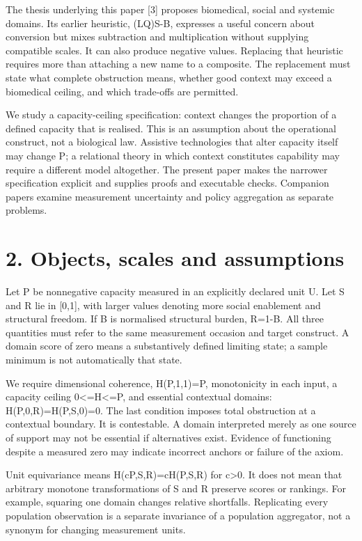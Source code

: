 \documentclass[11pt,a4paper]{article}
\begin{document}
The thesis underlying this paper [3] proposes biomedical, social and systemic domains. Its earlier heuristic, (LQ)S-B, expresses a useful concern about conversion but mixes subtraction and multiplication without supplying compatible scales. It can also produce negative values. Replacing that heuristic requires more than attaching a new name to a composite. The replacement must state what complete obstruction means, whether good context may exceed a biomedical ceiling, and which trade-offs are permitted.

We study a capacity-ceiling specification: context changes the proportion of a defined capacity that is realised. This is an assumption about the operational construct, not a biological law. Assistive technologies that alter capacity itself may change P; a relational theory in which context constitutes capability may require a different model altogether. The present paper makes the narrower specification explicit and supplies proofs and executable checks. Companion papers examine measurement uncertainty and policy aggregation as separate problems.

\section*{2. Objects, scales and assumptions}
Let P be nonnegative capacity measured in an explicitly declared unit U. Let S and R lie in [0,1], with larger values denoting more social enablement and structural freedom. If B is normalised structural burden, R=1-B. All three quantities must refer to the same measurement occasion and target construct. A domain score of zero means a substantively defined limiting state; a sample minimum is not automatically that state.

We require dimensional coherence, H(P,1,1)=P, monotonicity in each input, a capacity ceiling 0\textless{}=H\textless{}=P, and essential contextual domains: H(P,0,R)=H(P,S,0)=0. The last condition imposes total obstruction at a contextual boundary. It is contestable. A domain interpreted merely as one source of support may not be essential if alternatives exist. Evidence of functioning despite a measured zero may indicate incorrect anchors or failure of the axiom.

Unit equivariance means H(cP,S,R)=cH(P,S,R) for c\textgreater{}0. It does not mean that arbitrary monotone transformations of S and R preserve scores or rankings. For example, squaring one domain changes relative shortfalls. Replicating every population observation is a separate invariance of a population aggregator, not a synonym for changing measurement units.
\end{document}

